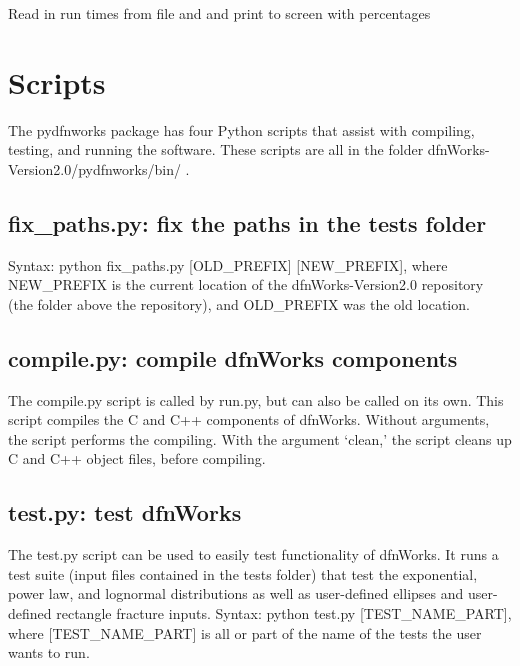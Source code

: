 \documentclass[letterpaper,10pt,english]{sphinxmanual}
\begin{document}

\begin{fulllineitems}
\label{pydfnworks:pydfnworks.helper.print_run_time}
Read in run times from file and and print to screen with percentages

\end{fulllineitems}



\chapter{Scripts}
\label{scripts:scripts}\label{scripts::doc}\label{scripts:scripts-chapter}
The pydfnworks package has four Python scripts that assist with compiling, testing, and running the software. These scripts are all in the folder dfnWorks-Version2.0/pydfnworks/bin/ .


\section{fix\_paths.py: fix the paths in the tests folder}
\label{scripts:fix-paths-py-fix-the-paths-in-the-tests-folder}
Syntax: python fix\_paths.py {[}OLD\_PREFIX{]} {[}NEW\_PREFIX{]}, where NEW\_PREFIX is the current location of the dfnWorks-Version2.0 repository (the folder above the repository), and OLD\_PREFIX was the old location.


\section{compile.py: compile dfnWorks components}
\label{scripts:compile-py-compile-dfnworks-components}
The compile.py script is called by run.py, but can also be called on its own. This script compiles the C and C++ components of dfnWorks. Without arguments, the script performs the compiling. With the argument `clean,' the script cleans up C and C++ object files, before compiling.


\section{test.py: test dfnWorks}
\label{scripts:test-py-test-dfnworks}
The test.py script can be used to easily test functionality of dfnWorks. It runs a test suite (input files contained in the tests folder) that test the exponential, power law, and lognormal distributions as well as user-defined ellipses and user-defined rectangle fracture inputs.
Syntax: python test.py {[}TEST\_NAME\_PART{]}, where {[}TEST\_NAME\_PART{]} is all or part of the name of the tests the user wants to run.
\end{document}
